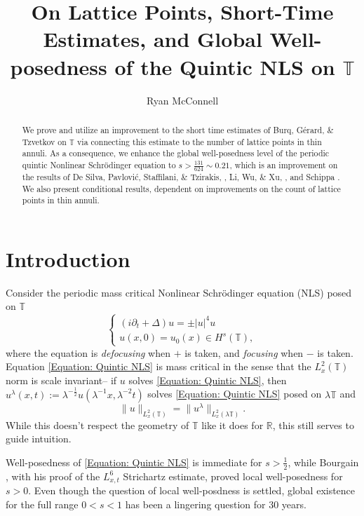 \documentclass[12pt, letterpaper]{amsart}
\title{\vspace{-1 in} On Lattice Points, Short-Time Estimates, and Global Well-posedness of the Quintic NLS on $\mathbb{T}$}
\author{Ryan McConnell}
\begin{document}
\begin{abstract}
    We prove and utilize an improvement to the short time estimates of Burq, G\'erard, \& Tzvetkov \cite{BurqShortTime} on $\mathbb{T}$ via connecting this estimate to the number of lattice points in thin annuli. As a consequence, we enhance the global well-posedness level of the periodic quintic Nonlinear Schr\"odinger equation to $s > \frac{131}{624}\sim 0.21$, which is an improvement on the results of De Silva, Pavlovi\'c, Staffilani, \& Tzirakis, \cite{de2007global}, Li, Wu, \& Xu, \cite{li2011global}, and Schippa \cite{schippa2024improved}. We also present conditional results, dependent on improvements on the count of lattice points in thin annuli.
    \end{abstract}
\maketitle
\tableofcontents

\section{Introduction}
Consider the periodic mass critical Nonlinear Schr\"odinger equation (NLS) posed on $\mathbb{T}$
\begin{equation}\label{Equation: Quintic NLS}
    \begin{cases}
        (i\partial_t+\Delta)u = \pm |u|^4u\\
        u(x,0) = u_0(x)\in H^s(\mathbb{T}),
    \end{cases}
\end{equation}
where the equation is \textit{defocusing} when $+$ is taken, and \textit{focusing} when $-$ is taken. Equation \eqref{Equation: Quintic NLS} is mass critical in the sense that the $L^2_x(\mathbb{T})$ norm is scale invariant-- if $u$ solves \eqref{Equation: Quintic NLS}, then $u^{\lambda}(x,t) := \lambda^{-\frac12}u(\lambda^{-1} x, \lambda^{-2} t)$ solves \eqref{Equation: Quintic NLS} posed on $\lambda \mathbb{T}$ and
\[
\|u\|_{L^2_x(\mathbb{T})} = \|u^{\lambda}\|_{L^2_x(\lambda\mathbb{T})}.
\]
While this doesn't respect the geometry of $\mathbb{T}$ like it does for $\mathbb{R}$, this still serves to guide intuition. 

Well-posedness of \eqref{Equation: Quintic NLS} is immediate for $s > \frac12$, while Bourgain \cite{Bour1}, with his proof of the $L^6_{x,t}$ Strichartz estimate, proved local well-posedness for $s > 0$. Even though the question of local well-posdness is settled, global existence for the full range $0 < s < 1$ has been a lingering question for $30$ years.
\end{document}
